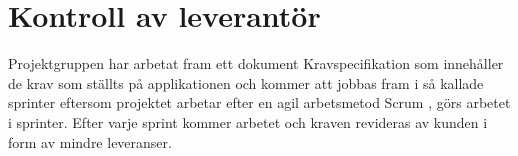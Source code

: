 \section{Kontroll av leverantör}
Projektgruppen har arbetat fram ett dokument Kravspecifikation som innehåller de krav som ställts på applikationen och kommer att jobbas fram i så kallade sprinter eftersom projektet arbetar efter en agil arbetsmetod Scrum \cite{website:scrum}, görs arbetet i sprinter. Efter varje sprint kommer arbetet och kraven revideras av kunden i form av mindre leveranser.